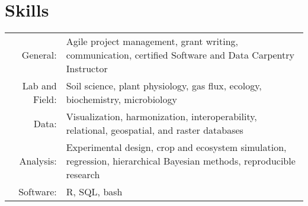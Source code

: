\documentclass[a4paper,10pt]{article}
\begin{document}

\section{Skills}
\begin{tabular}{rp{11cm}}
General:& Agile project management, grant writing, communication, certified Software and Data Carpentry Instructor \\
Lab and Field:& Soil science, plant physiology, gas flux, ecology, biochemistry, microbiology\\
Data: & Visualization, harmonization, interoperability, relational, geospatial, and raster databases \\
Analysis: & Experimental design, crop and ecosystem simulation, regression, hierarchical Bayesian methods, reproducible research \\ 
Software:& R, SQL, bash\\

\end{tabular}
\end{document}
